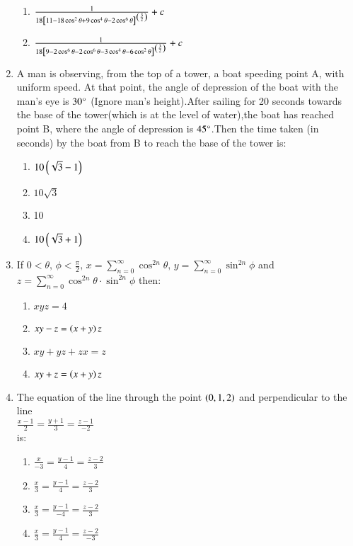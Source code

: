 \documentclass[journal]{IEEEtran}
\begin{document}
\begin{enumerate}
\begin{enumerate}
    \item $\frac{1}{18{}\left[11-18\cos^{2}\theta+9\cos^{4}\theta-2\cos^{6}\theta\right]^{\left(\frac{3}{2}\right)}}+c$
    \item $\frac{1}{18{}\left[9-2\cos^{6}\theta-2\cos^{6}\theta-3\cos^{4}\theta-6\cos^{2}\theta\right]^{\left(\frac{3}{2}\right)}}+c$
\end{enumerate}
\item A man is observing, from the top of a tower, a boat speeding point A, with uniform speed. At that point, the angle of depression of the boat with the man's eye is $30\degree$ (Ignore man's height).After sailing for 20 seconds towards the base of the tower(which is at the level of water),the boat has reached point B, where the angle of depression is $45\degree$.Then the time taken (in seconds) by the boat from B to reach the base of the tower is$\colon$
\begin{enumerate}
    \item $10\left(\sqrt{3}-1\right)$
    \item $10\sqrt{3}$
    \item 10
    \item $10\left(\sqrt{3}+1\right)$
\end{enumerate}
\item If $0\!<\theta, \, \phi < \frac{\pi}{2}, \,x=\sum_{n=0}^{\infty} \cos^{2n} \theta, \, y = \sum_{n=0}^{\infty} \sin^{2n} \phi $ and $z = \sum_{n=0}^{\infty} \cos^{2n} \theta \cdot \sin^{2n} \phi$ then$\colon$
\begin{enumerate}
    \item $xyz=4$
    \item $xy-z=\left(x+y\right)z$
    \item $xy+yz+zx=z$
    \item $xy+z=\left(x+y\right)z$
\end{enumerate}
\item The equation of the line through the point $\left(0,1,2\right)$ and perpendicular to the line\\$\frac{x-1}{2}=\frac{y+1}{3}=\frac{z-1}{-2}$\\is$\colon$
\begin{enumerate}
    \item $\frac{x}{-3}=\frac{y-1}{4}=\frac{z-2}{3}$
    \item $\frac{x}{3}=\frac{y-1}{4}=\frac{z-2}{3}$
    \item $\frac{x}{3}=\frac{y-1}{-4}=\frac{z-2}{3}$
    \item $\frac{x}{3}=\frac{y-1}{4}=\frac{z-2}{-3}$
\end{enumerate}

\end{enumerate}
\end{document}
